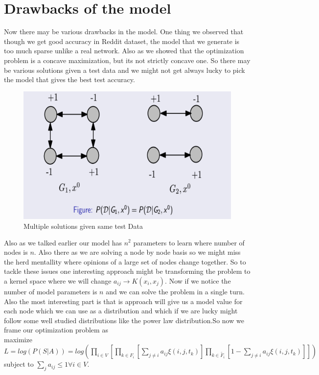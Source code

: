 \section*{Drawbacks of the model}
Now there may be various drawbacks in the model. One thing we observed that though we get good accuracy in Reddit dataset, the model that we generate is too much sparse unlike a real network. Also as we showed that the optimization problem is a concave maximization, but its not strictly concave one. So there may be various solutions given a test data and we might not get always lucky to pick the model that gives the best test accuracy.
\begin{figure}
\centering
\includegraphics[width=\textwidth,height=\textheight,keepaspectratio]{opinion_dynamics/images/non_strict.png}
\caption{Multiple solutions given same test Data}
\label{fig:Reddit_plot}
\end{figure}
Also as we talked earlier our model has $n^2$ parameters to learn where number of nodes is $n$. Also there as we are solving a node by node basis so we might miss the herd mentallity where opinions of a large set of nodes change together. So to tackle these issues one interesting approach might be transforming the problem to a kernel space where we will change $a_{ij} \rightarrow K(x_i,x_j)$. Now if we notice the number of model parameters is $n$ and we can solve the problem in a single turn. Also the most interesting part is that is approach will give us a model value for each node which we can use as a distribution and which if we are lucky might follow some well studied distributions like the power law distribution.So now we frame our optimization problem as \\
maximize $L = log(P(S|A)) = log(\displaystyle\prod_{i \in V}[\displaystyle\prod_{k \in F_i}[\displaystyle\sum_{j \neq i} a_{ij}\xi (i,j,t_k)]\displaystyle\prod_{k \in \widetilde{F_{i}}} [1-\displaystyle\sum_{j \neq i}a_{ij}\xi (i,j,t_k)]])$ subject to $\displaystyle\sum_{j} a_{ij} \leq 1 \forall i \in V$. 
